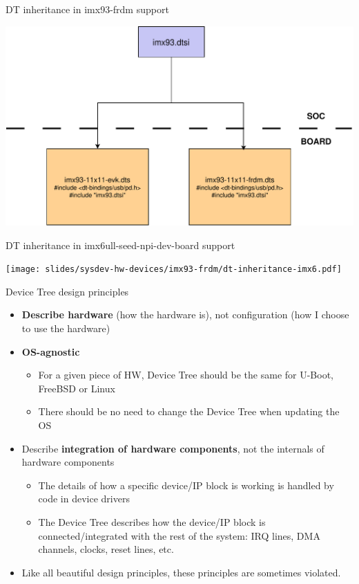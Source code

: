 \begin{frame}{DT inheritance in imx93-frdm support}
  \begin{center}
    \includegraphics[height=0.8\textheight]{slides/sysdev-hw-devices/imx93-frdm/dt-inheritance-imx93-frdm.pdf}
  \end{center}
\end{frame}

\begin{frame}{DT inheritance in imx6ull-seed-npi-dev-board support}
  \begin{center}
    \texttt{[image: slides/sysdev-hw-devices/imx93-frdm/dt-inheritance-imx6.pdf]}
  \end{center}
\end{frame}

\begin{frame}{Device Tree design principles}
  \begin{itemize}
  \item {\bf Describe hardware} (how the hardware is), not
    configuration (how I choose to use the hardware)
  \item {\bf OS-agnostic}
    \begin{itemize}
    \item For a given piece of HW, Device Tree should be the same for
      U-Boot, FreeBSD or Linux
    \item There should be no need to change the Device Tree when updating the OS
    \end{itemize}
  \item Describe {\bf integration of hardware components}, not the internals
    of hardware components
    \begin{itemize}
    \item The details of how a specific device/IP block is working is
      handled by code in device drivers
    \item The Device Tree describes how the device/IP block is
      connected/integrated with the rest of the system: IRQ lines, DMA
      channels, clocks, reset lines, etc.
    \end{itemize}
  \item Like all beautiful design principles, these principles are
    sometimes violated.
  \end{itemize}
\end{frame}

